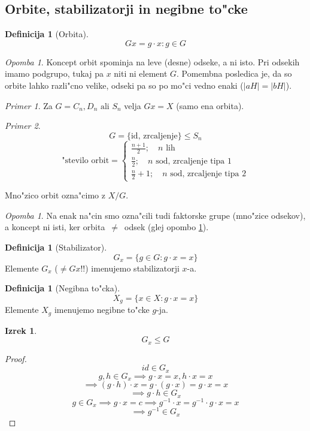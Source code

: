 \documentclass[a4paper,12pt]{article}
\theoremstyle{definition}
\newtheorem{defn}[counter]{Definicija}
\newtheorem{theorem}[counter]{Izrek}
\theoremstyle{remark}
\newtheorem*{ex}{Primer}
\newtheorem*{rem}{Opomba}
\newtheorem{rem*}[counter]{Opomba}
\begin{document}
\subsection{Orbite, stabilizatorji in negibne to"cke}
\begin{defn}[Orbita]
	$$Gx = {g \cdot x: g \in G}$$
\end{defn}
\begin{rem*}
	\label{orbita_neq_odsek}
	Koncept orbit spominja na leve (desne) odseke, a ni isto. Pri odsekih imamo podgrupo, tukaj pa $x$ niti ni element $G$. Pomembna posledica je, da so orbite lahko razli"cno velike, odseki pa so po mo"ci vedno enaki ($|aH|=|bH|$).
\end{rem*}
\begin{ex}
	Za $G=C_n, D_n \text{ ali } S_n$ velja $Gx = X$ (samo ena orbita).
\end{ex}
\begin{ex}
	$$G = \lbrace\text{id, zrcaljenje}\rbrace \leqslant S_n$$
	$$\text{"stevilo orbit} = \begin{cases}\frac{n+1}{2}; \quad n\text{ lih} \\ \frac{n}{2}; \quad n\text{ sod, zrcaljenje tipa }1 \\ \frac{n}{2}+1; \quad  n\text{ sod, zrcaljenje tipa }2\end{cases}$$
\end{ex}
Mno"zico orbit ozna"cimo z $X/G$.
\begin{rem}
	Na enak na"cin smo ozna"cili tudi faktorske grupe (mno"zice odsekov), a koncept ni isti, ker orbita~$\neq$~odsek (glej opombo \ref{orbita_neq_odsek}).
\end{rem}
\begin{defn}[Stabilizator]
	$$G_x = \lbrace g \in G: g \cdot x = x \rbrace$$
	Elemente $G_x$ ($\neq Gx$!!) imenujemo stabilizatorji $x$-a.
\end{defn}
\begin{defn}[Negibna to"cka]
	$$X_g = \lbrace x \in X: g \cdot x = x \rbrace$$
	Elemente $X_g$ imenujemo negibne to"cke $g$-ja.
\end{defn}
\begin{theorem}
	$$G_x \leqslant G$$
\end{theorem}
\begin{proof}
	$$id \in G_x$$
	$$g, h \in G_x \implies g \cdot x = x, h \cdot x = x$$
	$$\implies (g \cdot h) \cdot x = g \cdot (g \cdot x) = g \cdot x = x $$
	$$\implies g \cdot h \in G_x$$
	$$g \in G_x \implies g \cdot x = c \implies g^{-1} \cdot x = g^{-1} \cdot g \cdot x = x$$
	$$ \implies g^{-1} \in G_x $$
\end{proof}
\end{document}
